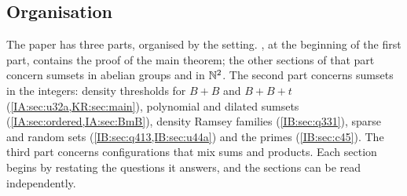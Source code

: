 \subsection*{Organisation}
The paper has three parts, organised by the setting. , at the beginning of the first
part, contains the proof of the main theorem; the other sections of that part concern sumsets in
abelian groups and in $\mathbb{N}^2$. The second part concerns sumsets in the integers: density thresholds
for $B+B$ and $B+B+t$ (\cref{IA:sec:u32a,KR:sec:main}), polynomial and dilated sumsets
(\cref{IA:sec:ordered,IA:sec:BmB}), density Ramsey families (\cref{IB:sec:q331}), sparse and random
sets (\cref{IB:sec:q413,IB:sec:u44a}) and the primes (\cref{IB:sec:c45}). The third part concerns
configurations that mix sums and products. Each section begins by restating the questions it
answers, and the sections can be read independently.
